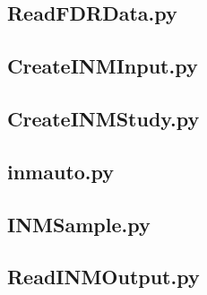 \documentclass[a4paper,12pt,twoside]{article}
\begin{document}
    \subsection*{ReadFDRData.py}
    \subsection*{CreateINMInput.py}
    \subsection*{CreateINMStudy.py}
    \subsection*{inmauto.py}
    \subsection*{INMSample.py}
    \subsection*{ReadINMOutput.py}
    \newpage
    
    
    
    \newpage
    
    \printglossaries
\end{document}
